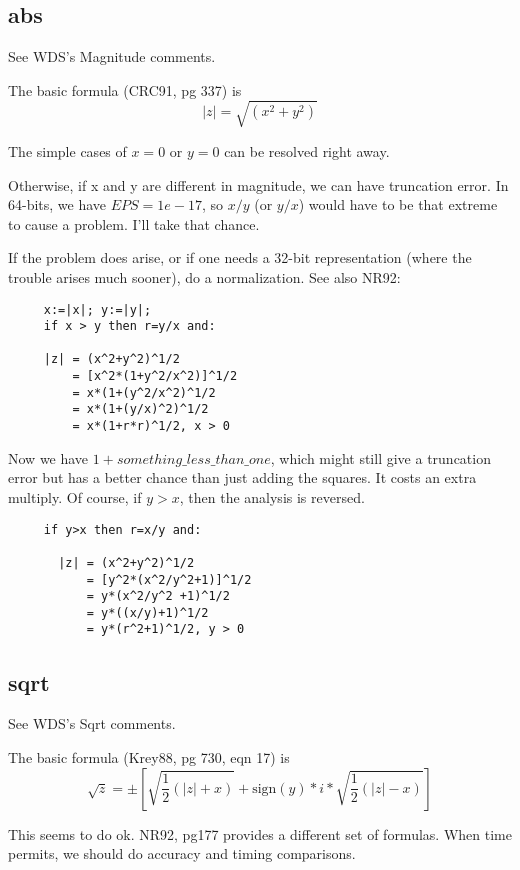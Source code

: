 \subsection*{abs}
See WDS's Magnitude comments.

The basic formula (CRC91, pg 337) is
\begin{equation}
  |z| = \sqrt{(x^2 + y^2)}
\end{equation}
     
The simple cases of $x=0$ or $y=0$ can be resolved right away.

Otherwise, if x and y are different in magnitude, we can
have truncation error.  In 64-bits, we have $EPS=1e-17$, so
$x/y$ (or $y/x$) would have to be that extreme to cause a
problem.  I'll take that chance.

If the problem does arise, or if one needs a 32-bit
representation (where the trouble arises much sooner), do a
normalization.  See also NR92:
\begin{verbatim}
     x:=|x|; y:=|y|;
     if x > y then r=y/x and:
     
     |z| = (x^2+y^2)^1/2
         = [x^2*(1+y^2/x^2)]^1/2
         = x*(1+(y^2/x^2)^1/2
         = x*(1+(y/x)^2)^1/2
         = x*(1+r*r)^1/2, x > 0
\end{verbatim}
          
Now we have $1 + something\_less\_than\_one$, which might still
give a truncation error but has a better chance than just
adding the squares.  It costs an extra multiply.  Of course,
if $y >x$, then the analysis is reversed.
\begin{verbatim}
     if y>x then r=x/y and:
     
       |z| = (x^2+y^2)^1/2
           = [y^2*(x^2/y^2+1)]^1/2
           = y*(x^2/y^2 +1)^1/2
           = y*((x/y)+1)^1/2
           = y*(r^2+1)^1/2, y > 0
\end{verbatim}

\subsection*{sqrt}
See WDS's Sqrt comments.

The basic formula (Krey88, pg 730, eqn 17) is
\begin{equation}
  \sqrt{z} = \pm \left[ \sqrt{\frac{1}{2}(|z| + x)} +
     \mbox{sign}(y)*i*\sqrt{\frac{1}{2}(|z| - x)}\right]
\end{equation}

This seems to do ok.  NR92, pg177 provides a different set
of formulas.  When time permits, we should do accuracy and
timing comparisons.

